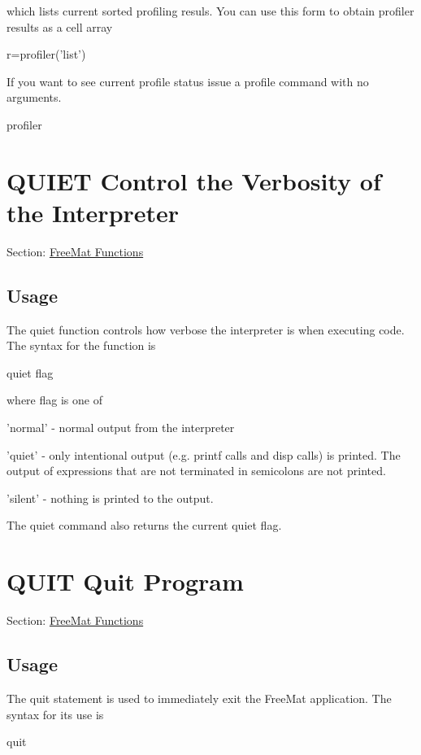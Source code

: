  which lists current sorted profiling resuls. You can use this form to obtain profiler results as a cell array \begin{DoxyVerb}  r=profiler('list')
\end{DoxyVerb}
 If you want to see current profile status issue a {\ttfamily profile} command with no arguments. \begin{DoxyVerb}   profiler
\end{DoxyVerb}
 \hypertarget{freemat_quiet}{}\section{Q\-U\-I\-E\-T Control the Verbosity of the Interpreter}\label{freemat_quiet}
Section\-: \hyperlink{sec_freemat}{Free\-Mat Functions} \hypertarget{vtkwidgets_vtkxyplotwidget_Usage}{}\subsection{Usage}\label{vtkwidgets_vtkxyplotwidget_Usage}
The {\ttfamily quiet} function controls how verbose the interpreter is when executing code. The syntax for the function is \begin{DoxyVerb}   quiet flag
\end{DoxyVerb}
 where {\ttfamily flag} is one of 
\begin{DoxyItemize}
\item {\ttfamily 'normal'} -\/ normal output from the interpreter  
\item {\ttfamily 'quiet'} -\/ only intentional output (e.\-g. {\ttfamily printf} calls and {\ttfamily disp} calls) is printed. The output of expressions that are not terminated in semicolons are not printed.  
\item {\ttfamily 'silent'} -\/ nothing is printed to the output.  
\end{DoxyItemize}The {\ttfamily quiet} command also returns the current quiet flag. \hypertarget{freemat_quit}{}\section{Q\-U\-I\-T Quit Program}\label{freemat_quit}
Section\-: \hyperlink{sec_freemat}{Free\-Mat Functions} \hypertarget{vtkwidgets_vtkxyplotwidget_Usage}{}\subsection{Usage}\label{vtkwidgets_vtkxyplotwidget_Usage}
The {\ttfamily quit} statement is used to immediately exit the Free\-Mat application. The syntax for its use is \begin{DoxyVerb}   quit
\end{DoxyVerb}
